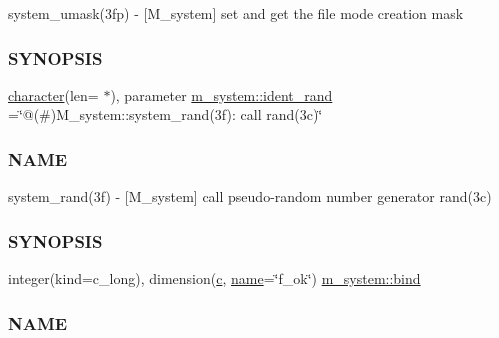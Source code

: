 \begin{DoxyCompactItemize}
\begin{DoxyCompactList}
system\+\_\+umask(3fp) -\/ \mbox{[}M\+\_\+system\mbox{]} set and get the file mode creation mask \subsubsection*{S\+Y\+N\+O\+P\+S\+IS}\end{DoxyCompactList}\item 
\hyperlink{option__stopwatch_83_8txt_abd4b21fbbd175834027b5224bfe97e66}{character}(len= $\ast$), parameter \hyperlink{namespacem__system_a7abe4c85d9ea573a1492865e21cee2be}{m\+\_\+system\+::ident\+\_\+rand} =\char`\"{}@(\#)M\+\_\+system\+::system\+\_\+rand(3f)\+: call rand(3c)\char`\"{}
\begin{DoxyCompactList}\small\item\em \subsubsection*{N\+A\+ME}

system\+\_\+rand(3f) -\/ \mbox{[}M\+\_\+system\mbox{]} call pseudo-\/random number generator rand(3c) \subsubsection*{S\+Y\+N\+O\+P\+S\+IS}\end{DoxyCompactList}\item 
integer(kind=c\+\_\+long), dimension(\hyperlink{c_8f90_aeb1f4e639be0213b4cbd07f2583a5b1f}{c}, \hyperlink{M__stopwatch_83_8txt_a3f508a893ae4c3b397b4383e33b9bcae}{name}=\char`\"{}f\+\_\+ok\char`\"{}) \hyperlink{namespacem__system_afe662f3eb5605285a495404491087190}{m\+\_\+system\+::bind}
\begin{DoxyCompactList}\small\item\em \subsubsection*{N\+A\+ME}


\end{DoxyCompactList}
\end{DoxyCompactItemize}

